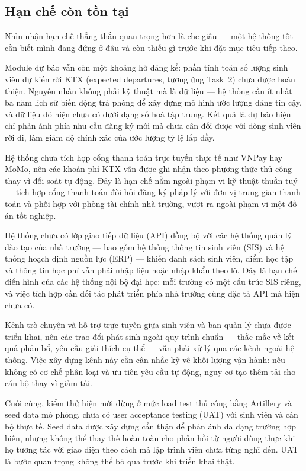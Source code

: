 \documentclass[../DoAn.tex]{subfiles}
\begin{document}
\subsection{Hạn chế còn tồn tại}
\label{subsection:6.1.3}

Nhìn nhận hạn chế thẳng thắn quan trọng hơn là che giấu --- một hệ thống tốt
cần biết mình đang đứng ở đâu và còn thiếu gì trước khi đặt mục tiêu tiếp theo.

Module dự báo vẫn còn một khoảng hở đáng kể: phần tính toán số lượng sinh viên
dự kiến rời KTX (expected departures, tương ứng Task~2) chưa được hoàn thiện.
Nguyên nhân không phải kỹ thuật mà là dữ liệu --- hệ thống cần ít nhất ba năm
lịch sử biến động trả phòng để xây dựng mô hình ước lượng đáng tin cậy, và dữ
liệu đó hiện chưa có dưới dạng số hoá tập trung. Kết quả là dự báo hiện chỉ
phản ánh phía nhu cầu đăng ký mới mà chưa cân đối được với dòng sinh viên rời
đi, làm giảm độ chính xác của ước lượng tỷ lệ lấp đầy.

Hệ thống chưa tích hợp cổng thanh toán trực tuyến thực tế như VNPay hay MoMo,
nên các khoản phí KTX vẫn được ghi nhận theo phương thức thủ công thay vì đối
soát tự động. Đây là hạn chế nằm ngoài phạm vi kỹ thuật thuần tuý --- tích hợp
cổng thanh toán đòi hỏi đăng ký pháp lý với đơn vị trung gian thanh toán và
phối hợp với phòng tài chính nhà trường, vượt ra ngoài phạm vi một đồ án tốt
nghiệp.

Hệ thống chưa có lớp giao tiếp dữ liệu (API) đồng bộ với các hệ thống quản lý
đào tạo của nhà trường --- bao gồm hệ thống thông tin sinh viên (SIS) và hệ
thống hoạch định nguồn lực (ERP) --- khiến danh sách sinh viên, điểm học tập và
thông tin học phí vẫn phải nhập liệu hoặc nhập khẩu theo lô. Đây là hạn chế
điển hình của các hệ thống nội bộ đại học: mỗi trường có một cấu trúc SIS riêng,
và việc tích hợp cần đối tác phát triển phía nhà trường cùng đặc tả API mà hiện
chưa có.

Kênh trò chuyện và hỗ trợ trực tuyến giữa sinh viên và ban quản lý chưa được
triển khai, nên các trao đổi phát sinh ngoài quy trình chuẩn --- thắc mắc về
kết quả phân bổ, yêu cầu giải thích cụ thể --- vẫn phải xử lý qua các kênh
ngoài hệ thống. Việc xây dựng kênh này cần cân nhắc kỹ về khối lượng vận hành:
nếu không có cơ chế phân loại và ưu tiên yêu cầu tự động, nguy cơ tạo thêm tải
cho cán bộ thay vì giảm tải.

Cuối cùng, kiểm thử hiện mới dừng ở mức load test thủ công bằng Artillery và
seed data mô phỏng, chưa có user acceptance testing (UAT) với sinh viên và cán
bộ thực tế. Seed data được xây dựng cẩn thận để phản ánh đa dạng trường hợp
biên, nhưng không thể thay thế hoàn toàn cho phản hồi từ người dùng thực khi
họ tương tác với giao diện theo cách mà lập trình viên chưa từng nghĩ đến. UAT
là bước quan trọng không thể bỏ qua trước khi triển khai thật.
\end{document}
